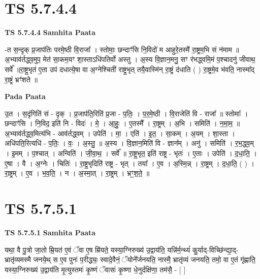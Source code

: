 \documentclass[17pt]{extarticle}
\begin{document}
\section*{ TS 5.7.4.4 }

\textbf{TS 5.7.4.4 } \newline
\textbf{Samhita Paata} \newline

-त स॒न्दृक् प्र॒जाप॑तिः परमे॒ष्ठी वि॒राजा᳚ । स्तोमाः॒ छन्दाꣳ॑सि नि॒विदो॑ म आहुरे॒तस्मै॑ रा॒ष्ट्रम॒भि सं न॑माम ॥अ॒भ्याव॑र्तद्ध्व॒मुप॒ मेत॑ सा॒कम॒यꣳ शा॒स्ताऽधि॑पतिर्वो अस्तु । अ॒स्य वि॒ज्ञान॒मनु॒ सꣳ र॑भद्ध्वमि॒मं प॒श्चादनु॑ जीवाथ॒ सर्वे᳚ ॥रा॒ष्ट्र॒भृत॑ ए॒ता उप॑ दधात्ये॒षा वा अ॒ग्नेश्चिती॑ राष्ट्र॒भृत् तयै॒वास्मि॑न् रा॒ष्ट्रं द॑धाति ( ) रा॒ष्ट्रमे॒व भ॑वति॒ नास्मा᳚द् रा॒ष्ट्रं भ्रꣳ॑शते ॥ \newline

\textbf{Pada Paata} \newline

उ॒त । स॒दृंगिति॑ सं - दृक् । प्र॒जाप॑ति॒रिति॑ प्र॒जा - प॒तिः॒ । प॒र॒मे॒ष्ठी । वि॒राजेति॑ वि - राजा᳚ ॥ स्तोमाः᳚ । छन्दाꣳ॑सि । नि॒विद॒ इति॑ नि - विदः॑ । मे॒ । आ॒हुः॒ । ए॒तस्मै᳚ । रा॒ष्ट्रम् । अ॒भि । समिति॑ । न॒मा॒म॒ ॥ अ॒भ्याव॑र्तद्ध्व॒मित्य॑भि - आव॑र्तद्ध्वम् । उपेति॑ । मा॒ । एति॑ । इ॒त॒ । सा॒कम् । अ॒यम् । शा॒स्ता । अधि॑पति॒रित्यधि॑ - प॒तिः॒ । वः॒ । अ॒स्तु॒ ॥ अ॒स्य । वि॒ज्ञान॒मिति॑ वि - ज्ञान᳚म् । अनु॑ । समिति॑ । र॒भ॒द्ध्व॒म् । इ॒मम् । प॒श्चात् । अन्विति॑ । जी॒वा॒थ॒ । सर्वे᳚ ॥ रा॒ष्ट्र॒भृत॒ इति॑ राष्ट्र - भृतः॑ । ए॒ताः । उपेति॑ । द॒धा॒ति॒ । ए॒षा । वै । अ॒ग्नेः । चितिः॑ । रा॒ष्ट्र॒भृदिति॑ राष्ट्र - भृत् । तया᳚ । ए॒व । अ॒स्मि॒न्न् । रा॒ष्ट्रम् । द॒धा॒ति॒ ( ) । रा॒ष्ट्रम् । ए॒व । भ॒व॒ति॒ । न । अ॒स्मा॒त् । रा॒ष्ट्रम् । भ्रꣳ॒॒श॒ते॒ ॥  \newline




\section*{ TS 5.7.5.1 }

\textbf{TS 5.7.5.1 } \newline
\textbf{Samhita Paata} \newline

यथा॒ वै पु॒त्रो जा॒तो म्रि॒यत॑ ए॒वं ॅवा ए॒ष म्रि॑यते॒ यस्या॒ग्निरुख्य॑ उ॒द्वाय॑ति॒ यन्नि॑र्म॒न्थ्यं॑ कु॒र्याद्-विच्छि॑न्द्या॒द्-भ्रातृ॑व्यमस्मै जनये॒थ् स ए॒व पुनः॑ प॒रीद्ध्यः॒ स्वादे॒वैनं॒ ॅयोने᳚र्जनयति॒ नास्मै॒ भ्रातृ॑व्यं जनयति॒ तमो॒ वा ए॒तं गृ॑ह्णाति॒ यस्या॒ग्निरुख्य॑ उ॒द्वाय॑ति मृ॒त्युस्तमः॑ कृ॒ष्णं ॅवासः॑ कृ॒ष्णा धे॒नुर्दक्षि॑णा॒ तम॑सै॒ - [  ] \newline
\end{document}
